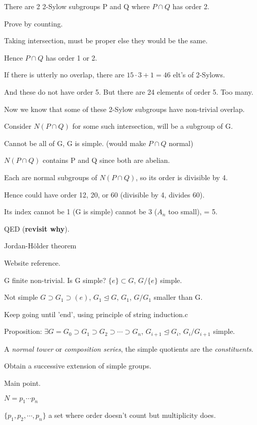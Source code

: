 \documentclass[12pt]{article}
\begin{document}
There are 2 2-Sylow subgroups P and Q where $P \cap Q$ has order 2.

Prove by counting.

Taking intersection, must be proper else they would be the same.

Hence $P \cap Q$ has order 1 or 2.

If there is utterly no overlap, there are $15 \cdot 3 + 1 = 46$ elt's of 2-Sylows.

And these do not have order 5.  But there are 24 elements of order 5.  Too many.

\noindent
Now we know that some of these 2-Sylow subgroups have non-trivial overlap.

Consider $N(P \cap Q)$ for some such intersection, will be a subgroup of G.

Cannot be all of G, G is simple. (would make $P \cap Q$ normal)

$N(P \cap Q)$ contains P and Q since both are abelian.

Each are normal subgroups of $N(P \cap Q)$, so its order is divisible by 4.

Hence could have order 12, 20, or 60 (divisible by 4, divides 60).

Its index cannot be 1 (G is simple) cannot be 3 ($A_n$ too small), = 5.

QED (\textbf{revisit why}).

\noindent
Jordan-H\"{o}lder theorem

Website reference.

\noindent
G finite non-trivial.  Is G simple?  $\{e\} \subset G$, $G/\{e\}$ simple.

Not simple $G \supset G_1 \supset (e)$, $G_1 \trianglelefteq G$, $G_1$, $G/G_1$ smaller than G.

Keep going until 'end', using principle of string induction.c

\noindent
Proposition: $\exists G = G_0 \supset G_1 \supset G_2 \supset \cdots \supset G_n$, $G_{i + 1} \trianglelefteq G_i$, $G_i/G_{i+1}$ simple.

A \textit{normal tower} or \textit{composition series}, the simple quotients are the \textit{constituents}.

Obtain a successive extension of simple groups.

\noindent
Main point.

$N = p_1\cdots p_n$

$\{p_1, p_2, \cdots, p_n\}$ a set where order doesn't count but multiplicity does.
\end{document}

